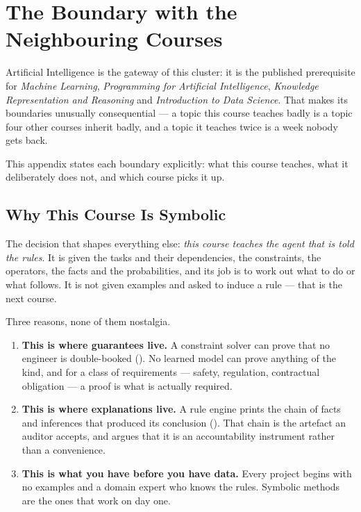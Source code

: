 \chapter{The Boundary with the Neighbouring Courses}\label{app:boundary}
\normalfigures

Artificial Intelligence is the gateway of this cluster: it is the published
prerequisite for \emph{Machine Learning}, \emph{Programming for Artificial
Intelligence}, \emph{Knowledge Representation and Reasoning} and
\emph{Introduction to Data Science}. That makes its boundaries unusually
consequential --- a topic this course teaches badly is a topic four other courses
inherit badly, and a topic it teaches twice is a week nobody gets back.

This appendix states each boundary explicitly: what this course teaches, what it
deliberately does not, and which course picks it up.

\section{Why This Course Is Symbolic}

The decision that shapes everything else: \emph{this course teaches the agent that
is told the rules}. It is given the tasks and their dependencies, the constraints,
the operators, the facts and the probabilities, and its job is to work out what to
do or what follows. It is not given examples and asked to induce a rule --- that is
the next course.

Three reasons, none of them nostalgia.

\begin{enumerate}[leftmargin=2.2em, itemsep=3pt, topsep=4pt]
  \item \textbf{This is where guarantees live.} A constraint solver can prove that
        no engineer is double-booked (). No learned model can prove
        anything of the kind, and for a class of requirements --- safety,
        regulation, contractual obligation --- a proof is what is actually
        required.
  \item \textbf{This is where explanations live.} A rule engine prints the chain of
        facts and inferences that produced its conclusion (). That
        chain is the artefact an auditor accepts, and  argues
        that it is an accountability instrument rather than a convenience.
  \item \textbf{This is what you have before you have data.} Every project begins
        with no examples and a domain expert who knows the rules. Symbolic methods
        are the ones that work on day one.
\end{enumerate}

